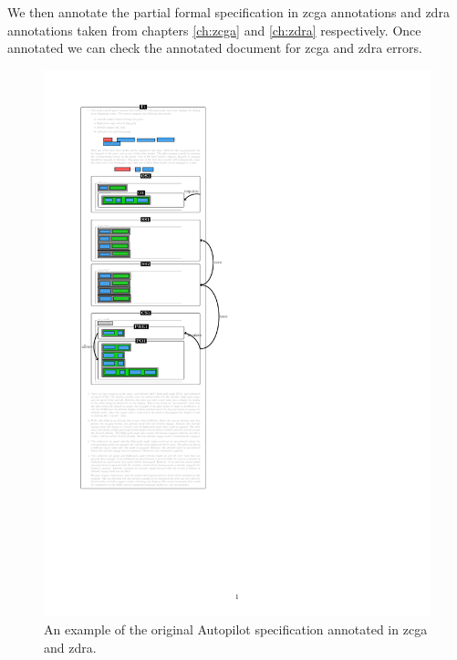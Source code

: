 We then annotate the partial formal specification in \gls{zcga} annotations and \gls{zdra} annotations taken from chapters \ref{ch:zcga} and \ref{ch:zdra} respectively. Once annotated we can check the annotated document for \gls{zcga} and \gls{zdra} errors. 

\begin{figure}[H]
\centering
\begin{minipage}{0.45\textwidth}
\centering
\includegraphics[clip, trim=0cm 8cm 6cm 2cm, scale=0.6]{examples/semiform/1n2.pdf}
\vspace{-0.18in}
\caption{An example of the original Autopilot specification annotated in \gls{zcga} and \gls{zdra}. \label{fig:autopilot1n2}}
\vspace{-0.2in}
\end{minipage}\hfill
\begin{minipage}{0.45\textwidth}
\centering

\end{minipage}
\end{figure}
